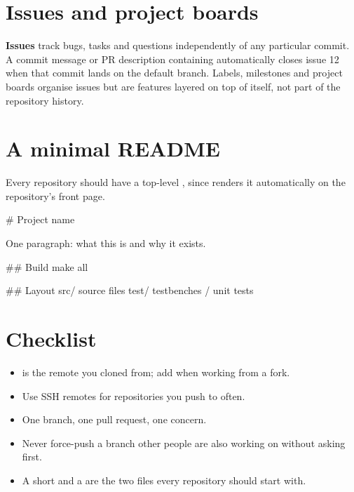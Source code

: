\section{Issues and project boards}

\textbf{Issues} track bugs, tasks and questions independently of any
particular commit. A commit message or PR description containing
 automatically closes issue 12 when that commit lands
on the default branch. Labels, milestones and project boards organise
issues but are \GitHub{} features layered on top of \Git{} itself, not
part of the repository history.

\section{A minimal README}

Every repository should have a top-level , since
\GitHub{} renders it automatically on the repository's front page.

\begin{txtcode}
# Project name

One paragraph: what this is and why it exists.

## Build
    make all

## Layout
    src/     source files
    test/    testbenches / unit tests
\end{txtcode}

\section{Checklist}
\label{sec:github:checklist}

\begin{itemize}
  \item {} is the remote you cloned from; add 
        when working from a fork.
  \item Use SSH remotes for repositories you push to often.
  \item One branch, one pull request, one concern.
  \item Never force-push a branch other people are also working on
        without asking first.
  \item A short  and a  are the two
        files every repository should start with.
\end{itemize}
